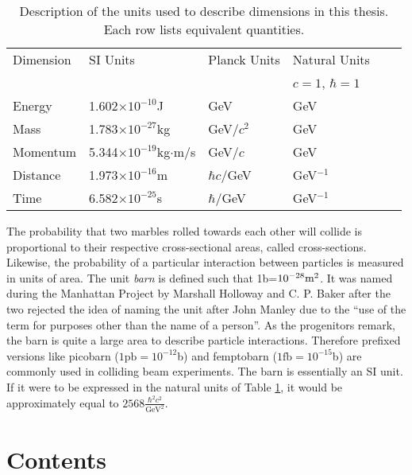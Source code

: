 \begin{table}[htp]
\begin{center}
\begin{tabular}{l l l l l l}
\toprule
Dimension & SI Units &  Planck Units & Natural Units \\
          &          &               & $c=1$, $\hbar = 1$ \\
\midrule
Energy    &    1.602$\times10^{-10}$J               & GeV            & GeV \\
Mass      &    1.783$\times10^{-27}$kg              & GeV/$c^2$      & GeV \\
Momentum  &    5.344$\times10^{-19}$kg$\cdot$m/s    & GeV/$c$        & GeV \\
Distance  &    1.973$\times10^{-16}$m               & $\hbar c/$GeV  & GeV$^{-1}$ \\
Time      &    6.582$\times10^{-25}$s               & $\hbar/$GeV    & GeV$^{-1}$ \\
\bottomrule
\end{tabular}
\caption{Description of the units used to describe dimensions in this thesis. Each row lists equivalent quantities.}
\label{tab:units}
\end{center}
\end{table}

The probability that two marbles rolled towards each other will collide is proportional to their respective cross-sectional areas, called cross-sections.
Likewise, the probability of a particular interaction between particles is measured in units of area.
The unit \emph{barn} is defined such that 1b=$10^{-28}\text m^2$.
It was named during the Manhattan Project by Marshall Holloway and C. P. Baker after the two rejected the idea of naming the unit after John Manley due to the ``use of the term for purposes other than the name of a person''.\cite{holloway}
As the progenitors remark, the barn is quite a large area to describe particle interactions.
Therefore prefixed versions like picobarn ($1\text{pb}=10^{-12}$b) and femptobarn ($1\text{fb}=10^{-15}$b) are commonly used in colliding beam experiments.
The barn is essentially an SI unit. If it were to be expressed in the natural units of Table \ref{tab:units}, it would be approximately equal to $2568\frac{\hbar^2 c^2}{\text{GeV}^2}$.

\section{Contents}

